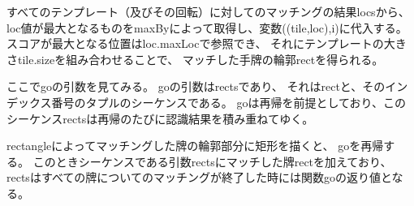\documentclass{jsarticle}
\begin{document}
\begin{multicols}{2}

すべてのテンプレート（及びその回転）に対してのマッチングの結果locsから、
loc値が最大となるものをmaxByによって取得し、変数((tile,loc),i)に代入する。
スコアが最大となる位置はloc.maxLocで参照でき、
それにテンプレートの大きさtile.sizeを組み合わせることで、
マッチした手牌の輪郭rectを得られる。

ここでgoの引数を見てみる。
goの引数はrectsであり、
それはrectと、そのインデックス番号のタプルのシーケンスである。
goは再帰を前提としており、このシーケンスrectsは再帰のたびに認識結果を積み重ねてゆく。

rectangleによってマッチングした牌の輪郭部分に矩形を描くと、
goを再帰する。
このときシーケンスである引数rectsにマッチした牌rectを加えており、
rectsはすべての牌についてのマッチングが終了した時には関数goの返り値となる。

\end{multicols}
\end{document}
